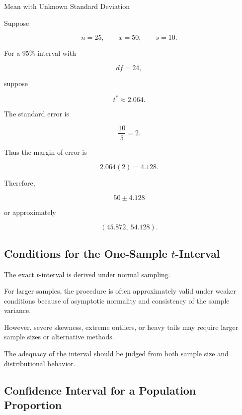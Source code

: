 \begin{workedexamplebox}{Mean with Unknown Standard Deviation}

Suppose

\[
n=25,
\qquad
\overline{x}=50,
\qquad
s=10.
\]

For a \(95\%\) interval with

\[
df=24,
\]

suppose

\[
t^*
\approx2.064.
\]

The standard error is

\[
\frac{10}{5}=2.
\]

Thus the margin of error is

\[
2.064(2)
=
4.128.
\]

Therefore,

\begin{answerbox}
\[
\boxed{
50\pm4.128
}
\]

or approximately

\[
\boxed{
(45.872,\ 54.128).
}
\]
\end{answerbox}

\end{workedexamplebox}

\subsection{Conditions for the One-Sample \(t\)-Interval}
\label{subsec:t-interval-conditions}

The exact \(t\)-interval is derived under normal sampling.

For larger samples, the procedure is often approximately valid under
weaker conditions because of asymptotic normality and consistency of the
sample variance.

However, severe skewness, extreme outliers, or heavy tails may require
larger sample sizes or alternative methods.

The adequacy of the interval should be judged from both sample size and
distributional behavior.

\subsection{Confidence Interval for a Population Proportion}
\label{subsec:ci-population-proportion}

